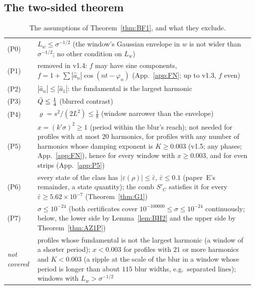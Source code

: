 \subsection{The two-sided theorem}

\begin{table}
\caption{The assumptions of Theorem~\ref{thm:BF1}, and what they exclude.}
\label{tab:assumptions}
\begin{ruledtabular}
\begin{tabular}{lp{}}
(P0) & $L_w\le\sigma^{-1/2}$ (the window's Gaussian envelope in $w$ is not wider than $\sigma^{-1/2}$; no other condition on $L_w$)\\
(P1) & removed in v1.4: $f$ may have sine components, $f=1+\sum|\hat a_n|\cos(nt-\varphi_n)$ (App.~\ref{app:FN}; up to v1.3, $f$ even)\\
(P2) & $|\hat a_n|\le|\hat a_1|$: the fundamental is the largest harmonic\\
(P3) & $\bar Q\le\tfrac14$ (blurred contrast)\\
(P4) & $\varrho=s^2/(2L^2)\le\tfrac18$ (window narrower than the envelope)\\
(P5) & $x=(k'\sigma)^2\ge1$ (period within the blur's reach); not needed for profiles with at most $20$ harmonics, for profiles with any number of harmonics whose damping exponent is $K\ge0.003$ (v1.5; any phases; App.~\ref{app:FN}), hence for every window with $x\ge0.003$, and for even strips (App.~\ref{app:P5})\\
(P6) & every state of the class has $|\varepsilon(\rho)|\le\bar\varepsilon$, $\bar\varepsilon\le0.1$ (paper~E's remainder, a state quantity); the comb $S'_C$ satisfies it for every $\bar\varepsilon\ge5.62\times10^{-7}$ (Theorem~\ref{thm:G1})\\
(P7) & $\sigma\le10^{-24}$ (both certificates cover $10^{-100000}\le\sigma\le10^{-24}$ continuously; below, the lower side by Lemma~\ref{lem:BH2} and the upper side by Theorem~\ref{thm:AZ1P})\\
\hline
\emph{not covered} & profiles whose fundamental is not the largest harmonic (a window of a shorter period);
$x<0.003$ for profiles with $21$ or more harmonics and $K<0.003$ (a ripple at the scale of the blur in a window whose period is longer than about $115$ blur widths, e.g.\ separated lines); windows with $L_w>\sigma^{-1/2}$\\
\end{tabular}
\end{ruledtabular}
\end{table}

